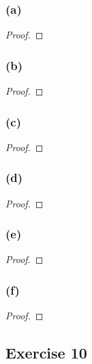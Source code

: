 \documentclass[14pt]{extarticle}
\begin{document}
\subsubsection{(a)}

\begin{proof}

\end{proof}

\subsubsection{(b)}

\begin{proof}

\end{proof}

\subsubsection{(c)}

\begin{proof}

\end{proof}

\subsubsection{(d)}

\begin{proof}

\end{proof}

\subsubsection{(e)}

\begin{proof}

\end{proof}

\subsubsection{(f)}

\begin{proof}

\end{proof}

\subsection{Exercise 10}
\end{document}
